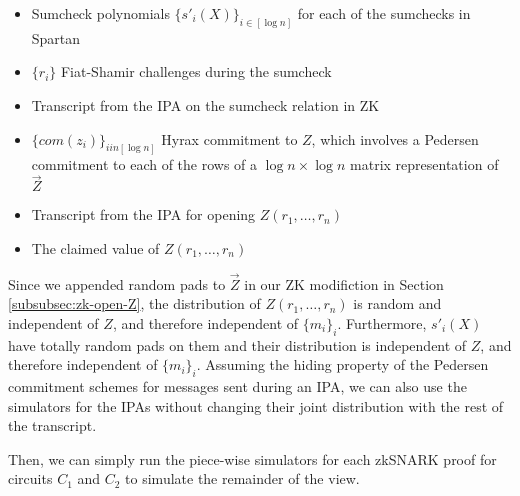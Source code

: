 \begin{itemize}
    \item Sumcheck polynomials $\{s'_i(X)\}_{i \in [\log n]}$ for each of the sumchecks in Spartan
    \item $\{r_i\}$ Fiat-Shamir challenges during the sumcheck
    \item Transcript from the IPA on the sumcheck relation in ZK
    \item $\{com(z_i)\}_{i in [\log n]}$ Hyrax commitment to $Z$, which involves a Pedersen commitment to each of the rows of a $\log n \times \log n$ matrix representation of $\vec{Z}$
    \item Transcript from the IPA for opening $Z(r_1, \dots, r_n)$
    \item The claimed value of $Z(r_1, \dots, r_n)$
\end{itemize}

Since we appended random pads to $\vec{Z}$ in our ZK modifiction in Section \ref{subsubsec:zk-open-Z}, the distribution of $Z(r_1, \dots, r_n)$ is random and independent of $Z$, and therefore independent of $\{m_i\}_i$.
Furthermore, $s'_i(X)$ have totally random pads on them and their distribution is independent of $Z$, and therefore independent of $\{m_i\}_i$.
Assuming the hiding property of the Pedersen commitment schemes for messages sent during an IPA, we can also use the simulators for the IPAs without changing their joint distribution with the rest of the transcript.

Then, we can simply run the piece-wise simulators for each zkSNARK proof for circuits $C_1$ and $C_2$ to simulate the remainder of the view. 


